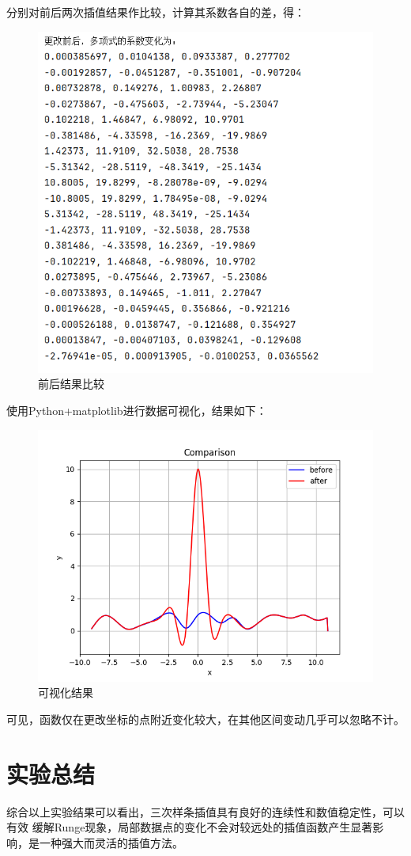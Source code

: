 \documentclass[12pt,a4paper,oneside]{article}
\begin{document}
分别对前后两次插值结果作比较，计算其系数各自的差，得：
\begin{figure}[H]
    \centering
    \includegraphics[scale = 0.8]{figs/comp.png}
    \caption{前后结果比较}
\end{figure}
使用Python+matplotlib进行数据可视化，结果如下：
\begin{figure}[H]
    \centering
    \includegraphics[scale = 0.7]{figs/myplot.png}
    \caption{可视化结果}
\end{figure}
可见，函数仅在更改坐标的点附近变化较大，在其他区间变动几乎可以忽略不计。

\section{实验总结}
综合以上实验结果可以看出，三次样条插值具有良好的连续性和数值稳定性，可以有效
缓解Runge现象，局部数据点的变化不会对较远处的插值函数产生显著影响，是一种强大而灵活的插值方法。
\end{document}
